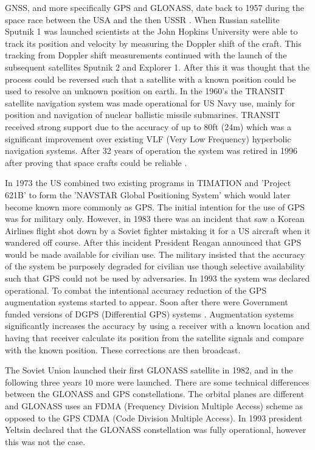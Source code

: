 GNSS, and more specifically GPS and GLONASS, date back to 1957 during the space race between the USA and the then USSR \cite{RN43}. When Russian satellite Sputnik 1 was
launched scientists at the John Hopkins University were able to track its position and velocity by measuring the Doppler shift of the craft. This tracking from Doppler
shift measurements continued with the launch of the subsequent satellites Sputnik 2 and Explorer 1. After this it was thought that the process could be reversed such that
a satellite with a known position could be used to resolve an unknown position on earth. In the 1960's the TRANSIT satellite navigation system was made operational for US
Navy use, mainly for position and navigation of nuclear ballistic missile submarines. TRANSIT received strong support due to the accuracy of up to 80ft (24m) which was a
significant improvement over existing VLF (Very Low Frequency) hyperbolic navigation systems. After 32 years of operation the system was retired in 1996 after proving
that space crafts could be reliable \cite{RN45}. 

In 1973 the US combined two existing programs in TIMATION and 'Project 621B' to form the 'NAVSTAR Global Positioning System' which would later become known more
commonly as GPS. The initial intention for the use of GPS was for military only. However, in 1983 there was an incident that saw a Korean Airlines flight shot down by a
Soviet fighter mistaking it for a US aircraft when it wandered off course. After this incident President Reagan announced that GPS would be made available for civilian
use. The military insisted that the accuracy of the system be purposely degraded for civilian use though selective availability such that GPS could not be used by
adversaries. In 1993 the system was declared operational. To combat the intentional accuracy reduction of the GPS augmentation systems started to appear. Soon
after there were Government funded versions of DGPS (Differential GPS) systems \cite{RN43}. Augmentation systems significantly increases the accuracy by using a receiver
with a known location and having that receiver calculate its position from the satellite signals and compare with the known position. These corrections are then
broadcast. 

The Soviet Union launched their first GLONASS satellite in 1982, and in the following three years 10 more were launched. There are some technical differences between the
GLONASS and GPS constellations. The orbital planes are different and GLONASS uses an FDMA (Frequency Division Multiple Access) scheme as opposed to the GPS CDMA (Code
Division Multiple Access). In 1993 president Yeltsin declared that the GLONASS constellation was fully operational, however this was not the case. 

